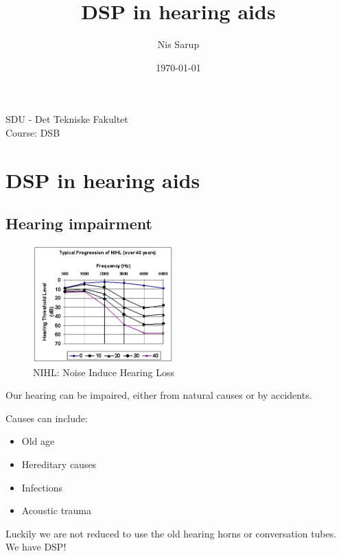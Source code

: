 \documentclass[a4wide,10pt]{article}
\begin{document}
\title{DSP in hearing aids}
\author{Nis Sarup}
\date{\today}
\maketitle
\begin{center}
	SDU - Det Tekniske Fakultet\\
	Course: DSB\\
\end{center}
\newpage

\section{DSP in hearing aids} %
\label{sec:dsp_in_hearing_aids}

\subsection{Hearing impairment} %
\label{sub:hearing_impairment}
\begin{figure}
	\vspace{-20pt}
	\begin{center}
		\includegraphics[width=0.48\textwidth]{images/nihl_graph.jpg}
	\end{center}
	\caption{NIHL: Noise Induce Hearing Loss}
	\vspace{-40pt}
\end{figure}
Our hearing can be impaired, either from natural causes or by accidents.


Causes can include:

\begin{itemize}
	\item Old age
	\item Hereditary causes
	\item Infections
	\item Acoustic trauma
\end{itemize}

Luckily we are not reduced to use the old hearing horns or conversation tubes. We have DSP!
\end{document}
